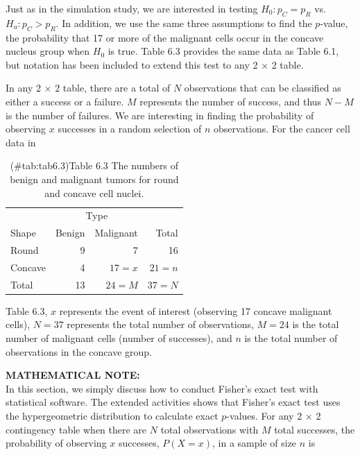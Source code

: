 \documentclass[
]{report}
\begin{document}
Just as in the simulation study, we are interested in testing \(H_0: p_C = p_R\) vs.~\(H_a: p_C > p_R\). In addition, we use the same three assumptions to find the \(p\)-value, the probability that 17 or more of the malignant cells occur in the concave nucleus group when \(H_0\) is true. Table 6.3 provides the same data as Table 6.1, but notation has been included to extend this test to any 2 × 2 table.

In any 2 × 2 table, there are a total of \(N\) observations that can be classified as either a success or a failure. \(M\) represents the number of success, and thus \(N - M\) is the number of failures. We are interesting in finding the probability of observing \(x\) successes in a random selection of \(n\) observations. For the cancer cell data in

\begin{table}[H]
\centering
\caption{(\#tab:tab6.3)Table 6.3 The numbers of benign and malignant tumors for round and concave cell nuclei.}
\centering
\begin{tabular}[t]{lrrr}
\toprule
\multicolumn{1}{c}{ } & \multicolumn{2}{c}{Type} & \multicolumn{1}{c}{ } \\
\cmidrule(l{3pt}r{3pt}){2-3}
Shape & Benign & Malignant & Total\\
\midrule
Round & 9 & 7 & 16\\
Concave & 4 & $17 = x$ & $21 = n$\\
Total & 13 & $24 = M$ & $37 = N$\\
\bottomrule
\end{tabular}
\end{table}

Table 6.3, \(x\) represents the event of interest (observing 17 concave malignant cells), \(N = 37\) represents the total number of observations, \(M = 24\) is the total number of malignant cells (number of successes), and \(n\) is the total number of observations in the concave group.

\large

\textbf{MATHEMATICAL NOTE:}\\
In this section, we simply discuss how to conduct Fisher's exact test with statistical software. The extended activities shows that Fisher's exact test uses the hypergeometric distribution to calculate exact \(p\)-values. For any 2 × 2 contingency table when there are \(N\) total observations with \(M\) total successes, the probability of observing \(x\) successes, \(P(X = x)\), in a sample of size \(n\) is
\normalsize
\end{document}
